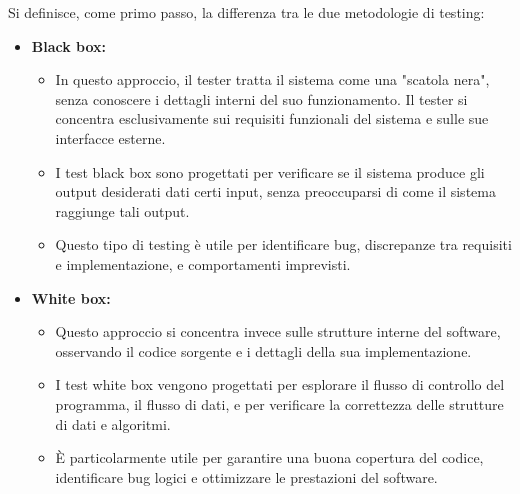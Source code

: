 \documentclass{article}
\begin{document}
	Si definisce, come primo passo, la differenza tra le due metodologie di testing:
	\begin{itemize}
		\item \textbf{Black box:}
		\begin{itemize}
			\item In questo approccio, il tester tratta il sistema come una "scatola nera", senza conoscere i dettagli interni del suo funzionamento. Il tester si concentra esclusivamente sui requisiti funzionali del sistema e sulle sue interfacce esterne.
			\item I test black box sono progettati per verificare se il sistema produce gli output desiderati dati certi input, senza preoccuparsi di come il sistema raggiunge tali output.
			\item Questo tipo di testing è utile per identificare bug, discrepanze tra requisiti e implementazione, e comportamenti imprevisti.
		\end{itemize}
		\item \textbf{White box:}
		\begin{itemize}
			\item Questo approccio si concentra invece sulle strutture interne del software, osservando il codice sorgente e i dettagli della sua implementazione.
			\item I test white box vengono progettati per esplorare il flusso di controllo del programma, il flusso di dati, e per verificare la correttezza delle strutture di dati e algoritmi.
			\item È particolarmente utile per garantire una buona copertura del codice, identificare bug logici e ottimizzare le prestazioni del software.
		\end{itemize}
	\end{itemize}
\end{document}
